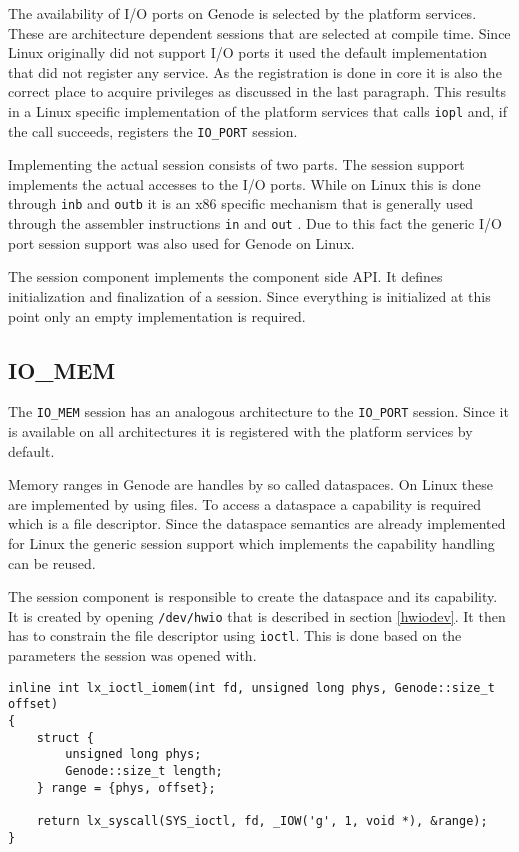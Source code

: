 \documentclass[
a4paper,
12pt,
notitlepage,
parskip=half,
DIV=11,
]{scrbook}
\begin{document}
		The availability of I/O ports on Genode is selected by the platform services.
		These are architecture dependent sessions that are selected at compile time.
		Since Linux originally did not support I/O ports it used the default implementation that did not register any service.
		As the registration is done in core it is also the correct place to acquire privileges as discussed in the last paragraph.
		This results in a Linux specific implementation of the platform services that calls \texttt{iopl} and, if the call succeeds, registers the \texttt{IO\_PORT} session.
		
		Implementing the actual session consists of two parts.
		The session support implements the actual accesses to the I/O ports.
		While on Linux this is done through \texttt{inb} and \texttt{outb} \citep{outb} it is an x86 specific mechanism that is generally used through the assembler instructions \texttt{in} and \texttt{out} \citep{intelmanual2}.
		Due to this fact the generic I/O port session support was also used for Genode on Linux.
		
		The session component implements the component side API.
		It defines initialization and finalization of a session.
		Since everything is initialized at this point only an empty implementation is required.
		
		\subsection{IO\_MEM}
		
		The \texttt{IO\_MEM} session has an analogous architecture to the \texttt{IO\_PORT} session.
		Since it is available on all architectures it is registered with the platform services by default.
		
		Memory ranges in Genode are handles by so called dataspaces.
		On Linux these are implemented by using files.
		To access a dataspace a capability is required which is a file descriptor.
		Since the dataspace semantics are already implemented for Linux the generic session support which implements the capability handling can be reused.
		
		The session component is responsible to create the dataspace and its capability.
		It is created by opening \texttt{/dev/hwio} that is described in section \ref{hwiodev}.
		It then has to constrain the file descriptor using \texttt{ioctl}.
		This is done based on the parameters the session was opened with.
		
		\begin{lstlisting}[basicstyle=\ttfamily\footnotesize]
inline int lx_ioctl_iomem(int fd, unsigned long phys, Genode::size_t offset)
{
	struct {
		unsigned long phys;
		Genode::size_t length;
	} range = {phys, offset};

	return lx_syscall(SYS_ioctl, fd, _IOW('g', 1, void *), &range);
}
		\end{lstlisting}
		
\end{document}
